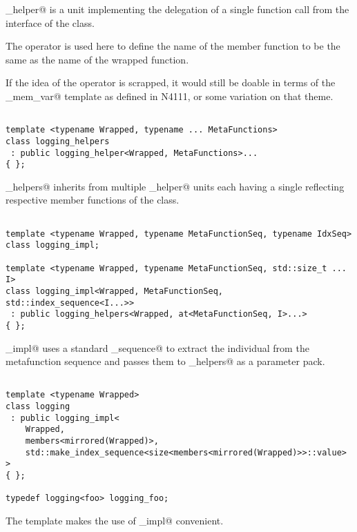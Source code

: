 \verb@logging_helper@ is a unit implementing the delegation of a single function
call from the interface of the \verb@Wrapped@ class. 

The \verb@identifier@ operator is used here to define the name of the member function
to be the same as the name of the wrapped function.

If the idea of the \verb@identifier@ operator is scrapped, it would still be doable
in terms of the \verb@named_mem_var@ template as defined in N4111, or some variation
on that theme.

\begin{verbatim}

template <typename Wrapped, typename ... MetaFunctions>
class logging_helpers
 : public logging_helper<Wrapped, MetaFunctions>...
{ };

\end{verbatim}

\verb@logging_helpers@ inherits from multiple \verb@logging_helper@ units
each having a single  reflecting respective member functions
of the \verb@Wrapper@ class.

\begin{verbatim}

template <typename Wrapped, typename MetaFunctionSeq, typename IdxSeq>
class logging_impl;

template <typename Wrapped, typename MetaFunctionSeq, std::size_t ... I>
class logging_impl<Wrapped, MetaFunctionSeq, std::index_sequence<I...>>
 : public logging_helpers<Wrapped, at<MetaFunctionSeq, I>...>
{ };

\end{verbatim}

\verb@logging_impl@ uses a standard \verb@index_sequence@ to extract the
individual  from the metafunction sequence and passes them
to \verb@logging_helpers@ as a parameter pack.


\begin{verbatim}

template <typename Wrapped>
class logging
 : public logging_impl<
	Wrapped,
	members<mirrored(Wrapped)>,
	std::make_index_sequence<size<members<mirrored(Wrapped)>>::value>
>
{ };

typedef logging<foo> logging_foo;

\end{verbatim}

The \verb@logging@ template makes the use of \verb@logging_impl@ convenient.

